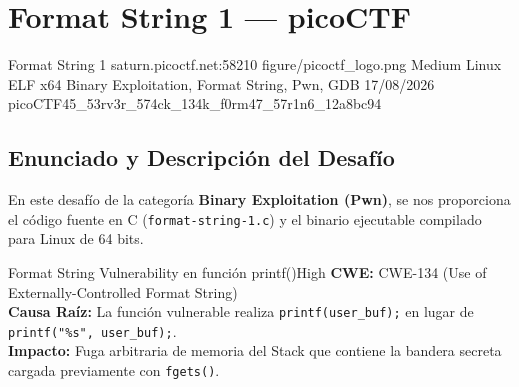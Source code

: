 \documentclass[../../../main_compilation.tex]{subfiles}
\begin{document}
\section[picoCTF - Format String 1 (Binary)]{Format String 1 — picoCTF}
\label{sec:ctf-pico-format-string-1}

\targetSummary%
  {Format String 1}%
  {saturn.picoctf.net:58210}%
  {figure/picoctf_logo.png}%
  {Medium}%
  {Linux ELF x64}%
  {Binary Exploitation, Format String, Pwn, GDB}%
  {17/08/2026}%
  {picoCTF{45_53rv3r_574ck_134k_f0rm47_57r1n6_12a8bc94}}%
  {}%

\vspace{0.4cm}

\subsection{Enunciado y Descripción del Desafío}
En este desafío de la categoría \textbf{Binary Exploitation (Pwn)}, se nos proporciona el código fuente en C (\texttt{format-string-1.c}) y el binario ejecutable compilado para Linux de 64 bits.

\begin{vulnbox}{Format String Vulnerability en función printf()}{High}
  \textbf{CWE:} CWE-134 (Use of Externally-Controlled Format String)\\
  \textbf{Causa Raíz:} La función vulnerable realiza \texttt{printf(user\_buf);} en lugar de \texttt{printf("\%s", user\_buf);}.\\
  \textbf{Impacto:} Fuga arbitraria de memoria del Stack que contiene la bandera secreta cargada previamente con \texttt{fgets()}.
\end{vulnbox}

\end{document}
